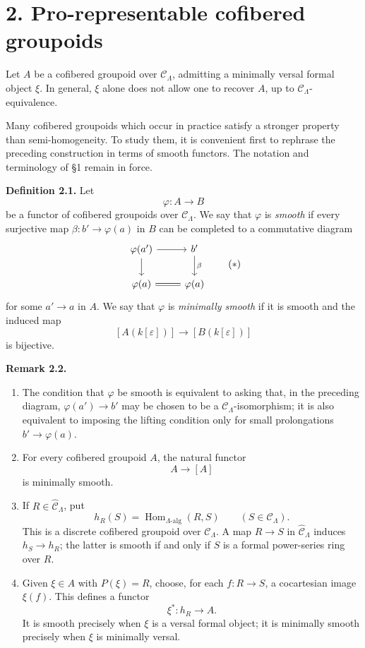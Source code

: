 \documentclass[11pt]{article}
\providecommand{\Hom}{\operatorname{Hom}}
\begin{document}
\section*{2. Pro-representable cofibered groupoids}

Let \(A\) be a cofibered groupoid over \(\mathcal C_\Lambda\), admitting a minimally
versal formal object \(\xi\). In general, \(\xi\) alone does not allow one to recover
\(A\), up to \(\mathcal C_\Lambda\)-equivalence.

Many cofibered groupoids which occur in practice satisfy a stronger property than
semi-homogeneity. To study them, it is convenient first to rephrase the preceding
construction in terms of smooth functors. The notation and terminology of §1 remain
in force.

\textbf{Definition 2.1.} Let
\[
 \varphi:A\longrightarrow B
\]
be a functor of cofibered groupoids over \(\mathcal C_\Lambda\). We say that
\(\varphi\) is \emph{smooth} if every surjective map
\(\beta:b'\to\varphi(a)\) in \(B\) can be completed to a commutative diagram
\[
\begin{tikzcd}
\varphi(a') \arrow[r] \arrow[d] & b' \arrow[d,"\beta"]\\
\varphi(a) \arrow[r,equal] & \varphi(a)
\end{tikzcd}
\qquad\text{(\(*\))}
\]
for some \(a'\to a\) in \(A\). We say that \(\varphi\) is \emph{minimally smooth}
if it is smooth and the induced map
\[
 [A(k[\varepsilon])]\longrightarrow [B(k[\varepsilon])]
\]
is bijective.

\textbf{Remark 2.2.}
\begin{enumerate}[label=(\alph*)]
\item The condition that \(\varphi\) be smooth is equivalent to asking that, in the preceding
diagram, \(\varphi(a')\to b'\) may be chosen to be a \(\mathcal C_\Lambda\)-isomorphism; it is
also equivalent to imposing the lifting condition only for small prolongations
\(b'\to\varphi(a)\).

\item For every cofibered groupoid \(A\), the natural functor
\[
 A\longrightarrow [A]
\]
is minimally smooth.

\item If \(R\in\widehat{\mathcal C}_\Lambda\), put
\[
 h_R(S)=\Hom_{\Lambda\text{-}\mathrm{alg}}(R,S)\qquad(S\in\mathcal C_\Lambda).
\]
This is a discrete cofibered groupoid over \(\mathcal C_\Lambda\). A map \(R\to S\) in
\(\widehat{\mathcal C}_\Lambda\) induces \(h_S\to h_R\); the latter is smooth if and
only if \(S\) is a formal power-series ring over \(R\).

\item Given \(\xi\in A\) with \(P(\xi)=R\), choose, for each \(f:R\to S\), a cocartesian
image \(\xi(f)\). This defines a functor
\[
 \xi^\ast:h_R\longrightarrow A.
\]
It is smooth precisely when \(\xi\) is a versal formal object; it is minimally smooth
precisely when \(\xi\) is minimally versal.
\end{enumerate}
\end{document}
